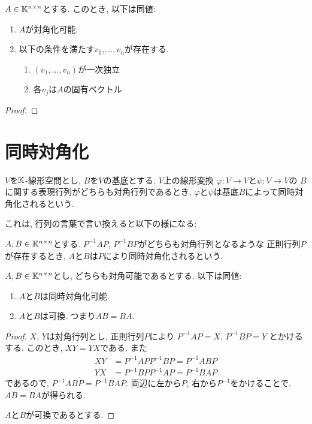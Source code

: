 \begin{prop}
  $A\in\mathbb{K}^{n\times n}$とする.
  このとき, 以下は同値:
  \begin{enumerate}
  \item $A$が対角化可能.
  \item
    以下の条件を満たす$v_1,\ldots,v_n$が存在する.
\begin{enumerate}
\item $(v_1,\ldots,v_n)$が一次独立
\item  各$v_j$は$A$の固有ベクトル
  \end{enumerate}
  \end{enumerate}
\end{prop}
\begin{proof}\end{proof}



\section{同時対角化}
\begin{definition}
$V$を$\mathbb{K}$-線形空間とし,
$B$を$V$の基底とする.
$V$上の線形変換
$\varphi\colon V\to V$と$\psi\colon V\to V$の
$B$に関する表現行列がどちらも対角行列であるとき,
$\varphi$と$\psi$は基底$B$によって同時対角化されるという.
\end{definition}
これは, 行列の言葉で言い換えると以下の様になる:
\begin{definition}
$A,B\in\mathbb{K}^{n\times n}$とする.
$P^{-1}AP$, $P^{-1}BP$がどちらも対角行列となるような
正則行列$P$が存在するとき,
$A$と$B$は$P$により同時対角化されるという.
\end{definition}
\begin{prop}
$A,B\in\mathbb{K}^{n\times n}$とし,
どちらも対角可能であるとする.
以下は同値:
\begin{enumerate}
\item $A$と$B$は同時対角化可能.
\item $A$と$B$は可換. つまり$AB=BA$.
\end{enumerate}
\end{prop}
\begin{proof}
$X$, $Y$は対角行列とし,
正則行列$P$により
$P^{-1}AP=X$, $P^{-1}BP=Y$
とかけるする.
このとき,
$XY=YX$である.
また
\begin{align*}
XY&=P^{-1}APP^{-1}BP=P^{-1}ABP\\
YX&=P^{-1}BPP^{-1}AP=P^{-1}BAP
\end{align*}
であるので, $P^{-1}ABP=P^{-1}BAP$.
両辺に左から$P$, 右から$P^{-1}$をかけることで,
$AB=BA$が得られる.

$A$と$B$が可換であるとする.

\end{proof}

